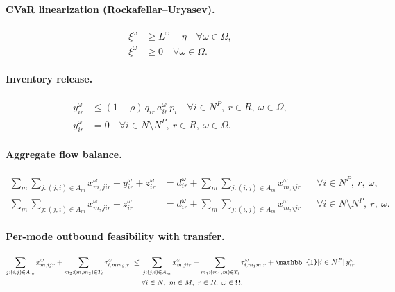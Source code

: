 \paragraph{CVaR linearization (Rockafellar--Uryasev).}
\begin{align}
\xi^\omega &\geq L^\omega - \eta \quad \forall \omega \in \Omega,
  \label{eq:vif:cvar1} \\
\xi^\omega &\geq 0 \quad \forall \omega \in \Omega. \label{eq:vif:cvar2}
\end{align}

\paragraph{Inventory release.}
\begin{align}
y^\omega_{ir} &\leq (1-\rho)\, \bar{q}_{ir}\, a^\omega_{ir}\, p_i
  \quad \forall i \in N^P,\ r \in R,\ \omega \in \Omega, \label{eq:vif:release} \\
y^\omega_{ir} &= 0
  \quad \forall i \in N \setminus N^P,\ r \in R,\ \omega \in \Omega.
  \label{eq:vif:norelease}
\end{align}

\paragraph{Aggregate flow balance.}
\begin{align}
\sum_{m}\sum_{j:(j,i)\in A_m} x^\omega_{m,jir} + y^\omega_{ir} + z^\omega_{ir}
  &= d^\omega_{ir} + \sum_{m}\sum_{j:(i,j)\in A_m} x^\omega_{m,ijr}
  &&\forall i \in N^P,\ r,\ \omega, \label{eq:vif:balppl} \\
\sum_{m}\sum_{j:(j,i)\in A_m} x^\omega_{m,jir} + z^\omega_{ir}
  &= d^\omega_{ir} + \sum_{m}\sum_{j:(i,j)\in A_m} x^\omega_{m,ijr}
  &&\forall i \in N \setminus N^P,\ r,\ \omega. \label{eq:vif:balnon}
\end{align}

\paragraph{Per-mode outbound feasibility with transfer.}
\begin{align}
\sum_{j:(i,j)\in A_m} x^\omega_{m,ijr}
  + \sum_{m_2:(m,m_2)\in T_i} \tau^\omega_{i,mm_2,r}
\;\leq\;&
\sum_{j:(j,i)\in A_m} x^\omega_{m,jir}
  + \sum_{m_1:(m_1,m)\in T_i} \tau^\omega_{i,m_1m,r}
  + \mathbb{1}[i \in N^P]\, y^\omega_{ir} \notag \\
&\forall i \in N,\ m \in M,\ r \in R,\ \omega \in \Omega. \label{eq:vif:permode}
\end{align}

